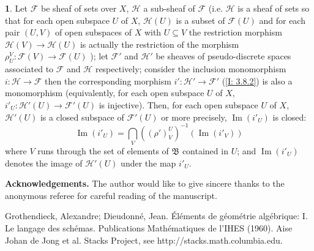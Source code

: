 \documentclass[12pt]{amsart}
\newcommand{\Ima}{\operatorname{Im}}
\theoremstyle{definition}
\newtheorem{bk}[proposition]{}
\begin{document}
\begin{bk}\label{I: 3.8.3} Let $\mathscr{F}$ be sheaf of sets over $X$,  $\mathscr{H}$ a sub-sheaf of $\mathscr{F}$ (i.e. $\mathscr{H}$ is a sheaf of sets so that for each open subspace $U$ of $X$, $\mathscr{H}(U)$ is a subset of $\mathscr{F}(U)$ and for each pair $(U,V)$ of open subspaces of $X$ with $U\subseteq V$ the restriction morphism $\mathscr{H}(V)\rightarrow\mathscr{H}(U)$ is actually the restriction of the morphism $\rho_{U}^{V}:\mathscr{F}(V)\rightarrow\mathscr{F}(U)$ ); let $\mathscr{F}'$ and $\mathscr{H}'$ be sheaves of pseudo-discrete spaces associated to $\mathscr{F}$ and $\mathscr{H}$ respectively; consider the inclusion monomorphism $i:\mathscr{H}\rightarrow\mathscr{F}$ then the corresponding morphism $i':\mathscr{H}'\rightarrow\mathscr{F}'$ (\ref{I: 3.8.2}) is also a monomorphism (equivalently, for each open subspace $U$ of $X$,  $i'_{U}:\mathscr{H}'(U)\rightarrow\mathscr{F}'(U)$ is injective). Then, for each open subspace $U$ of $X$, $\mathscr{H}'(U)$ is a closed subspace of $\mathscr{F}'(U)$ or more precisely, $\Ima(i'_{U})$ is closed:
$$\Ima(i'_{U})=\bigcap\limits_{V}((\rho')_{V}^{U})^{-1}(\Ima(i'_{V}))$$ where $V$ runs through the set of elements of $\mathfrak{B}$ contained in $U$; and $\Ima(i'_{U})$ denotes the image of $\mathscr{H}'(U)$ under the map $i'_{U}$.\\
\end{bk}

\textbf{Acknowledgements.} The author would like to give sincere thanks to the anonymous referee for careful reading of the manuscript.\\

\begin{thebibliography}{10}
Grothendieck, Alexandre; Dieudonn\'{e}, Jean. \'{E}l\'{e}ments de g\'{e}om\'{e}trie alg\'{e}brique: I. Le langage des sch\'{e}mas. Publications Math\'{e}matiques de l'IHES (1960).
Aise Johan de Jong et al. Stacks Project, see http://stacks.math.columbia.edu.
\end{thebibliography}
\end{document}
